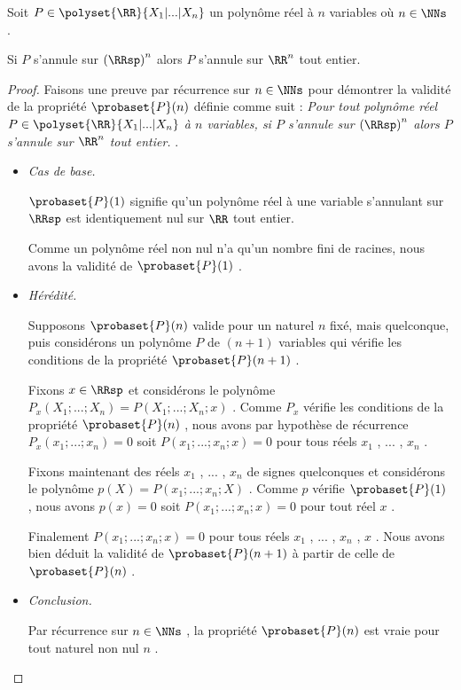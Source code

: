 \begin{fact} \label{poly-nullity-pos}
	Soit $P \in \polyset{\RR}{X_1 | ... | X_n}$ un polynôme réel à $n$ variables où $n \in \NNs$ .
	
	\smallskip
	
	Si $P$ s'annule sur $\left( \RRsp \right)^n$ alors $P$ s'annule sur $\RR^n$ tout entier. 
\end{fact}


\begin{proof}
	Faisons une preuve par récurrence sur $n \in \NNs$ pour démontrer la validité de la propriété $\probaset{P}(n)$ définie comme suit :
	\emph{\og 
		Pour tout polynôme réel $P \in \polyset{\RR}{X_1 | ... | X_n}$ à $n$ variables,
		si $P$ s'annule sur $\left( \RRsp \right)^n$ alors $P$ s'annule sur $\RR^n$ tout entier. 
	\fg}.

	\begin{itemize}[label=\small\textbullet]
		\item \emph{Cas de base.}
	
		\noindent
		$\probaset{P}(1)$ signifie qu'un polynôme réel à une variable s'annulant sur $\RRsp$ est identiquement nul sur $\RR$ tout entier.
		
		\smallskip
		\noindent
		Comme un polynôme réel non nul n'a qu'un nombre fini de racines, nous avons la validité de $\probaset{P}(1)$ .


		\medskip
		\item \emph{Hérédité.}
	
		\noindent
		Supposons $\probaset{P}(n)$ valide pour un naturel $n$ fixé, mais quelconque, puis considérons un polynôme $P$ de $(n + 1)$ variables qui vérifie les conditions de la propriété $\probaset{P}(n + 1)$ .
	
		\smallskip
		\noindent
		Fixons $x \in \RRsp$ et considérons le polynôme $P_x(X_1 ; ... ; X_n) = P(X_1 ; ... ; X_n ; x)$ .
		Comme $P_x$  vérifie les conditions de la propriété $\probaset{P}(n)$ ,
		nous avons par hypothèse de récurrence 
		$P_x(x_1 ; ... ; x_n) = 0$ soit $P(x_1 ; ... ; x_n ; x) = 0$ pour tous réels $x_1$ , ... , $x_n$ .
	
		\smallskip
		\noindent
		Fixons maintenant des réels $x_1$ , ... , $x_n$ de signes quelconques et considérons le polynôme $p(X) = P(x_1 ; ... ; x_n ; X)$ .
		Comme $p$ vérifie $\probaset{P}(1)$ , nous avons $p(x) = 0$ soit $P(x_1 ; ... ; x_n ; x) = 0$ pour tout réel $x$ .
	
		\smallskip
		\noindent
		Finalement $P(x_1 ; ... ; x_n ; x) = 0$ pour tous réels $x_1$ , ... , $x_n$ , $x$ .
		Nous avons bien déduit la validité de $\probaset{P}(n+1)$ à partir de celle de $\probaset{P}(n)$ .


	\medskip
	\item \emph{Conclusion.}
	
	\smallskip
	\noindent
	Par récurrence sur $n \in \NNs$ , la propriété $\probaset{P}(n)$ est vraie pour tout naturel non nul $n$ .
	\end{itemize}
\end{proof}


